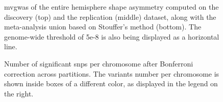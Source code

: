 \begin{table}[H]
\begin{adjustwidth}{-3 cm}{-2.5 cm}
\begin{threeparttable}[!htb]
\end{threeparttable}\end{adjustwidth}
\caption[Identified lead \acp{snp} for the entire hemisphere]{Identified lead \acp{snp} for the entire hemisphere across the different datasets, along with a comparison with \citet{Sha2021}. In gray, \acp{snp} with significance less than 1e-8 but greater than 5e-8 are reported. In bold are displayed the variants identified both in the present study and in the work of \citet{Sha2021}.}
\label{tab:leadsnps}
\end{table}

\begin{figure}[H]
	\centering
	\subfloat{
		
	}
	\par\medskip
	\centering
	\subfloat{
			
	}
	\par\medskip
	\centering
	\subfloat{
			
	}
	\caption[mvGWAS of the entire hemisphere shape asymmetry]{\Ac{mvgwas} of the entire hemisphere shape asymmetry computed on the discovery (top) and the replication (middle) dataset, along with the meta-analysis union based on Stouffer's method (bottom). The genome-wide threshold of 5e-8 is also being displayed as a horizontal line.}
	\label{fig:entire_gwas}
\end{figure}


\begin{figure}[H]
	\begin{adjustwidth}{-4cm}{-3.5cm}
	\centering
	\subfloat{
		
	}
	\par\medskip
	\raggedleft
	\subfloat{
		
	}	

\end{adjustwidth}
	\caption[Number of significant SNPs after Bonferroni correction along partitions]{Number of significant \acp{snp} per chromosome after Bonferroni correction across partitions. The variants number per chromosome is shown inside boxes of a different color, as displayed in the legend on the right.}
	\label{fig:part_bonferroni}
\end{figure}

